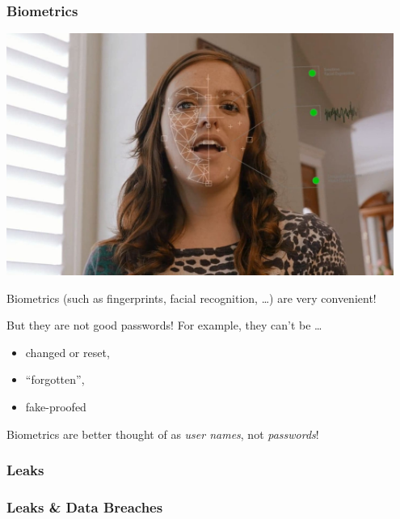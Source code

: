 \documentclass[aspectratio=169,dvipsnames]{beamer}
\begin{document}
\begin{frame}
\frametitle{Biometrics}

\begin{minipage}{0.5\textwidth}
\begin{center}
\includegraphics[width=0.95\textwidth, keepaspectratio]{images/hirevue.jpeg}
\end{center}
\end{minipage}\quad
\begin{minipage}{0.45\textwidth}
Biometrics (such as fingerprints, facial recognition, \dots) are very convenient!
\medskip

But they are not good passwords! For example, they can't be \dots

\begin{itemize}
\pause\item changed or reset,
\pause\item ``forgotten'',
\pause\item fake-proofed
\end{itemize}
\end{minipage}

\pause\bigskip
\begin{center}
\Large
Biometrics are better thought of as \emph{user names}, not \emph{passwords}!
\end{center}
\end{frame}

\subsubsection{Leaks}

\begin{frame}
\frametitle{Leaks \& Data Breaches}
\end{frame}
\end{document}

